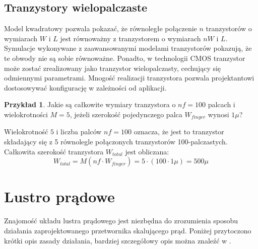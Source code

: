 \documentclass[10pt,a4paper,twoside]{report}
\theoremstyle{definition}
\theoremstyle{definition}
\theoremstyle{definition}
\newtheorem{przyklad}{Przykład}[section]
\theoremstyle{definition}
\theoremstyle{definition}
\begin{document}
{	\subsection{Tranzystory wielopalczaste}
	{	Model kwadratowy pozwala pokazać, że równoległe połączenie $n$ tranzystorów o wymiarach $W$ i $L$ jest równoważny z tranzystorem o wymiarach $nW$ i $L$. Symulacje wykonywane z zaawansowanymi modelami tranzystorów pokazują, że te obwody nie są sobie równoważne. Ponadto, w technologii CMOS tranzystor może zostać zrealizowany jako tranzystor wielopalczasty, cechujący się odmiennymi parametrami. Mnogość realizacji tranzystora pozwala projektantowi dostosowywać konfigurację w zależności od aplikacji. }
	\begin{przyklad}{Jakie są całkowite wymiary tranzystora o $nf=100$ palcach i wielokrotności $M=5$, jeżeli szerokość pojedynczego palca $W_{finger}$ wynosi $1\mu$?}

	{	Wielokrotność $5$ i liczba palców $nf=100$ oznacza, że jest to tranzystor składający się z 5 równolegle połączonych tranzystorów 100-palczastych. Całkowita szerokość tranzystora $W_{total}$ jest obliczana:
	\begin{equation}
		W_{total} = M \left(nf \cdot W_{finger}  \right) = 5 \cdot \left(100 \cdot 1\mu \right) = 500 \mu 
	\end{equation}}
	\end{przyklad}
	

	\section{Lustro prądowe}
	{	Znajomość układu lustra prądowego jest niezbędna do zrozumienia sposobu działania zaprojektowanego przetwornika skalującego prąd. Poniżej przytoczono krótki opis zasady działania, bardziej szczegółowy opis można znaleźć w \cite{cmosanal}.}
}
\end{document}

